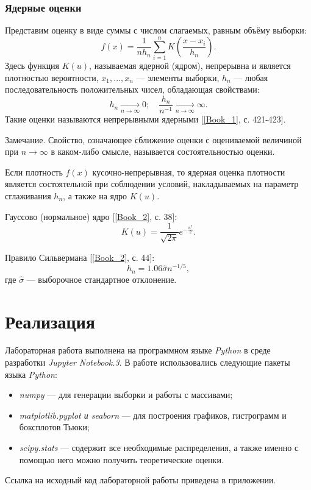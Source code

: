 \documentclass[12pt,a4paper]{article}
\begin{document}
		\subsubsection{Ядерные оценки}
			Представим оценку в виде суммы с числом слагаемых, равным объёму выборки:
			\begin{equation}\label{eqn:pdf_sum}
			\hat{f}(x) = \frac{1}{nh_n}\sum_{i=1}^{n}K(\frac{x-x_i}{h_n}).
			\end{equation}
			Здесь функция $K(u)$, называемая ядерной (ядром), непрерывна и является плотностью вероятности, $x_1, ... ,x_n$ --- элементы выборки, ${h_n}$ --- любая последовательность положительных чисел, обладающая свойствами:
			\begin{equation}\label{eqn:h cond}
			h_n \xrightarrow[n\rightarrow\infty]{}0; \quad \frac{h_n}{n^{-1}}\xrightarrow[n\rightarrow\infty]{}\infty.
			\end{equation}
			Такие оценки называются непрерывными ядерными [\ref{Book_1}, с. 421-423].
			
			Замечание. Свойство, означающее сближение оценки с оцениваемой величиной при $n\rightarrow\infty$ в каком-либо смысле, называется состоятельностью оценки. 
			
			Если плотность $f(x)$ кусочно-непрерывная, то ядерная оценка плотности является состоятельной при соблюдении условий, накладываемых на параметр сглаживания $h_n$, а также на ядро $K(u)$.
			
			Гауссово (нормальное) ядро [\ref{Book_2}, с. 38]:
			\begin{equation}\label{eqn:Kernel fun}
			K(u)=\frac{1}{\sqrt{2\pi}}e^{-\frac{u^2}{2}}.
			\end{equation}
			
			Правило Сильвермана [\ref{Book_2}, с. 44]:
			\begin{equation}\label{eqn:Silverman rule}
			h_n = 1.06\hat{\sigma}n^{-1/5},
			\end{equation}
			где $\hat{\sigma}$ --- выборочное стандартное отклонение.
		
		
		
\section{Реализация}
	Лабораторная работа выполнена на программном языке \emph{Python} в среде разработки \emph{Jupyter Notebook.3}. В работе использовались следующие пакеты языка \emph{Python}:
	\begin{itemize}
		\item \emph{numpy} --- для генерации выборки и работы с массивами;
		
		\item \emph{matplotlib.pyplot  и seaborn} --- для построения графиков, гистрограмм и боксплотов Тьюки;
		
		\item \emph{scipy.stats} --- содержит все необходимые распределения, а также именно с помощью него можно получить теоретические оценки.
	\end{itemize}
	Ссылка на исходный код лабораторной работы приведена в приложении.
	
\end{document}
